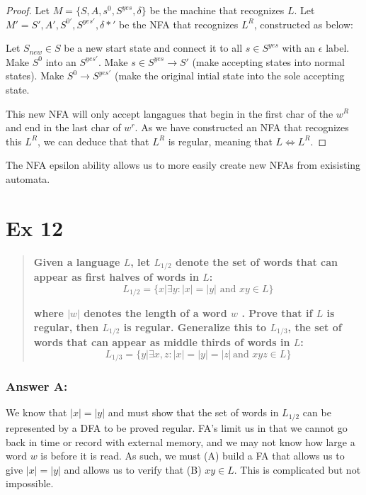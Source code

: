 \documentclass[titlepage]{article}\usepackage[]{graphicx}\usepackage[]{color}
\begin{document}
\begin{proof} 
	Let $M = \{S, A, s^0, S^{yes}, \delta\}$ be the machine that recognizes $L$.
	Let $M' = {S',A',S^{0'}, S^{yes'}, \delta*'}$ be the NFA that recognizes
	$L^R$, constructed as below:

	Let $S_{new} \in S$ be a new start state and connect it to all $s \in S^{yes}$
	with an $\epsilon$ label. 
	Make $S^0$ into an $S^{yes'}$. 
	Make $s \in S^{yes} \to S'$ (make accepting states into normal states).
	Make $S^{0} \to S^{yes'}$ (make the original intial state into the sole
	accepting state.

	This new NFA will only accept langagues that begin in the first char of the
	$w^R$ and end in the last char of $w^r$. As we have constructed an NFA that
	recognizes this $L^R$, we can deduce that that $L^R$ is regular, meaning
	that $L \Leftrightarrow L^R$.
\end{proof}

The NFA epsilon ability allows us to more easily create new NFAs from
exisisting automata.



\section*{Ex 12}
\begin{quote}
	\textbf{Given a language $L$, let $L_{1/2}$ denote the set of words that can appear
    as first halves of words in $L$:}
    \[ L_{1/2} = \{ x | \exists y : |x| = |y| \text{ and } x y \in L \} \]
    
  \textbf{where $|w |$ denotes the length of a word $w$ . Prove that if $L$ is
      regular, then $L_{1/2}$ is regular. Generalize this to $L_{1/3}$, the set of
      words that can appear as middle thirds of words in $L$:}
  \[ L_{1/3} = \{ y | \exists x,z : |x| = |y| = |z|\,  \text{and } x y z \in L \} \]
  
\end{quote}
\subsubsection*{Answer A:}
We know that $|x| = |y|$ and must show that the set of words in $L_{1/2}$ can
be represented by a DFA to be proved regular. FA's limit us in that we cannot
go back in time or record with external memory, and we may not know how large a
word $w$ is before it is read. As such, we must (A) build a FA that allows us to
give $|x| = |y|$ and allows us to verify that (B) $xy \in L$. This is complicated
but not impossible.
\end{document}

